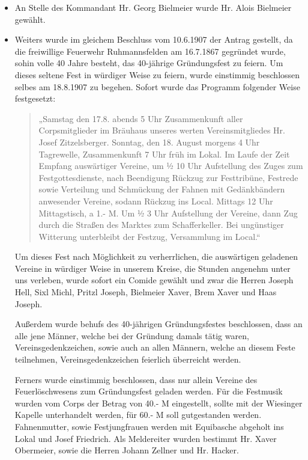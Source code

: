 \documentclass[12pt,a4paper]{book}
\begin{document}
\begin{itemize}
\item An Stelle des Kommandant Hr. Georg Bielmeier wurde Hr. Alois Bielmeier
gewählt.

\item Weiters wurde im gleichem Beschluss vom 10.6.1907 der Antrag gestellt, da
die freiwillige Feuerwehr Ruhmannsfelden am 16.7.1867 gegründet wurde, sohin
volle 40 Jahre besteht, das 40-jährige Gründungsfest zu feiern. Um dieses
seltene Fest in würdiger Weise zu feiern, wurde einstimmig beschlossen selbes am
18.8.1907 zu begehen. Sofort wurde das Programm folgender Weise festgesetzt:

\begin{quote}
„Samstag den 17.8. abends 5 Uhr Zusammenkunft aller Corpsmitglieder im Bräuhaus
unseres werten Vereinsmitgliedes Hr. Josef Zitzelsberger. Sonntag, den 18.
August morgens 4 Uhr Tagrewelle, Zusammenkunft 7 Uhr früh im Lokal. Im Laufe der
Zeit Empfang auswärtiger Vereine, um ½ 10 Uhr Aufstellung des Zuges zum
Festgottesdienste, nach Beendigung Rückzug zur Festtribüne, Festrede sowie
Verteilung und Schmückung der Fahnen mit Gedänkbändern anwesender Vereine,
sodann Rückzug ins Local. Mittags 12 Uhr Mittagstisch, a 1.- M. Um ½ 3 Uhr
Aufstellung der Vereine, dann Zug durch die Straßen des Marktes zum
Schafferkeller. Bei ungünstiger Witterung unterbleibt der Festzug, Versammlung
im Local.“
\end{quote}

Um dieses Fest nach Möglichkeit zu verherrlichen, die auswärtigen geladenen
Vereine in würdiger Weise in unserem Kreise, die Stunden angenehm unter uns
verleben, wurde sofort ein Comide gewählt und zwar die Herren Joseph Hell, Sixl
Michl, Pritzl Joseph, Bielmeier Xaver, Brem Xaver und Haas Joseph.

Außerdem wurde behufs des 40-jährigen Gründungsfestes beschlossen, dass an alle
jene Männer, welche bei der Gründung damals tätig waren, Vereinsgedenkzeichen,
sowie auch an allen Männern, welche an diesem Feste teilnehmen,
Vereinsgedenkzeichen feierlich überreicht werden.

Ferners wurde einstimmig beschlossen, dass nur allein Vereine des
Feuerlöschwesens zum Gründungsfest geladen werden. Für die Festmusik wurden vom
Corps der Betrag von 40.- M eingestellt, sollte mit der Wiesinger Kapelle
unterhandelt werden, für 60.- M soll gutgestanden werden. Fahnenmutter, sowie
Festjungfrauen werden mit Equibasche abgeholt ins Lokal und Josef Friedrich. Als
Meldereiter wurden bestimmt Hr. Xaver Obermeier, sowie die Herren Johann Zellner
und Hr. Hacker.


\end{itemize}
\end{document}
